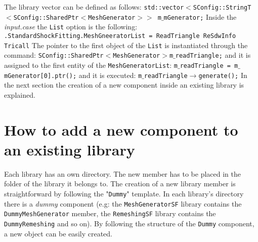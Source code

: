 \documentclass[11pt,a4paper,oneside]{article}
\begin{document}
The library vector can be defined as follows:
\newline
\newline
\hspace*{0.8cm}
\texttt{\footnotesize{std::vector$<$SConfig::StringT$<$SConfig::SharedPtr$<$MeshGenerator$>>$ m$\_$mGenerator;}}
\newline
\newline
Inside the \textit{input.case} the \texttt{List} option is the following:
\newline
\newline
\hspace*{0.8cm}
\texttt{.StandardShockFitting.MeshGneeratorList = ReadTriangle ReSdwInfo Tricall}
\newline
\newline
The pointer to the first object of the \texttt{List} is instantiated through the command:
\newline
\newline
\hspace*{0.8cm}
\texttt{SConfig::SharedPtr$<$MeshGenerator$>$m$\_$readTriangle;}
\newline
\newline
and it is assigned to the first entity of the \texttt{MeshGeneratorList}:
\newline
\newline
\hspace*{0.8cm}
\texttt{m$\_$readTriangle = m$\_$mGenerator[0].ptr();}
\newline
\newline
and it is executed:
\newline
\newline
\hspace*{0.8cm}
\texttt{m$\_$readTriangle$\rightarrow$generate();}
\newline
\newline
In the next section the creation of a new component inside an existing library is explained.

\section{How to add a new component to an existing library}
\label{sec:create a library component}

Each library has an own directory. The new member has to be placed in the folder of the library it belongs to.
\newline
The creation of a new library member is straightforward by following the "\texttt{Dummy}" template. 
\newline
In each library's directory there is a \textit{dummy} component (e.g: the \texttt{MeshGeneratorSF} library contains the \texttt{DummyMeshGenerator} member, the \texttt{RemeshingSF} library contains the \texttt{DummyRemeshing} and so on). By following the structure of the \texttt{Dummy} component, a new object can be easily created.
\end{document}
